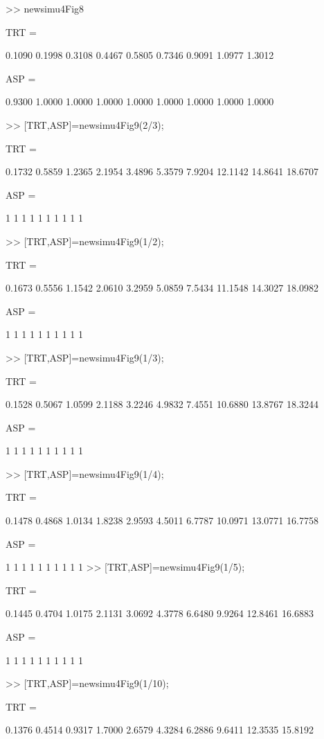 >> newsimu4Fig8

TRT =

    0.1090    0.1998    0.3108    0.4467    0.5805    0.7346    0.9091    1.0977    1.3012


ASP =

    0.9300    1.0000    1.0000    1.0000    1.0000    1.0000    1.0000    1.0000    1.0000


>> [TRT,ASP]=newsimu4Fig9(2/3);

TRT =

    0.1732    0.5859    1.2365    2.1954    3.4896    5.3579    7.9204   12.1142   14.8641   18.6707


ASP =

     1     1     1     1     1     1     1     1     1     1

>> [TRT,ASP]=newsimu4Fig9(1/2);

TRT =

    0.1673    0.5556    1.1542    2.0610    3.2959    5.0859    7.5434   11.1548   14.3027   18.0982


ASP =

     1     1     1     1     1     1     1     1     1     1

>> [TRT,ASP]=newsimu4Fig9(1/3);

TRT =

    0.1528    0.5067    1.0599    2.1188    3.2246    4.9832    7.4551   10.6880   13.8767   18.3244


ASP =

     1     1     1     1     1     1     1     1     1     1

>> [TRT,ASP]=newsimu4Fig9(1/4);

TRT =

    0.1478    0.4868    1.0134    1.8238    2.9593    4.5011    6.7787   10.0971   13.0771   16.7758


ASP =

     1     1     1     1     1     1     1     1     1     1
>> [TRT,ASP]=newsimu4Fig9(1/5);

TRT =

    0.1445    0.4704    1.0175    2.1131    3.0692    4.3778    6.6480    9.9264   12.8461   16.6883


ASP =

     1     1     1     1     1     1     1     1     1     1

>> [TRT,ASP]=newsimu4Fig9(1/10);

TRT =

    0.1376    0.4514    0.9317    1.7000    2.6579    4.3284    6.2886    9.6411   12.3535   15.8192


